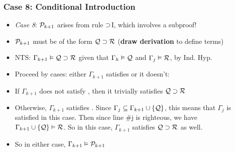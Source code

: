 \begin{frame}
\frametitle{Case 8: Conditional Introduction}

\begin{itemize}[<+->]

\item \emph{Case 8}: $\mathcal{P}_{k +1}$ arises from rule $\supset${}I, which involves a subproof! 

\item $\mathcal{P}_{k +1}$ must be of the form $\mathcal{Q} \supset \mathcal{R}$ (\textbf{draw derivation} to define terms)

\item NTS: $\Gamma_{k+1} \vDash \mathcal{Q} \supset \mathcal{R}$ given that $\Gamma_h \vDash \mathcal{Q}$ and \emph{$\Gamma_j \vDash \mathcal{R}$}, by Ind. Hyp.

\item Proceed by cases: either $\Gamma_{k+1}$ satisfies  or it doesn't:

\item If $\Gamma_{k+1}$ does not satisfy , then it trivially satisfies $\mathcal{Q} \supset \mathcal{R}$

\item Otherwise, $\Gamma_{k+1}$ satisfies . Since $\Gamma_j \subseteq \Gamma_{k+1} \cup \{ \mathcal{Q} \}$, this means that $\Gamma_j$ is satisfied in this case. Then since line \#j is righteous, we have $\Gamma_{k+1} \cup \{ \mathcal{Q} \} \vDash \mathcal{R}$. So in this case, $\Gamma_{k+1}$ satisfies $\mathcal{Q} \supset \mathcal{R}$ as well. 

\item So in either case, $\Gamma_{k+1} \vDash \mathcal{P}_{k+1}$



\end{itemize}
\end{frame}

